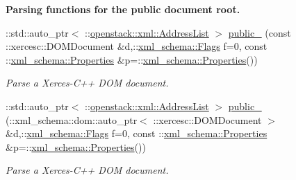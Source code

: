 \begin{Indent}{\bf Parsing functions for the public document root.}
\begin{DoxyCompactItemize}
::std::auto\_\-ptr$<$ ::\hyperlink{classopenstack_1_1xml_1_1AddressList}{openstack::xml::AddressList} $>$ \hyperlink{namespaceopenstack_1_1xml_a0148c3d230d30434ceac70b67bfb94c1}{public\_\-} (const ::xercesc::DOMDocument \&d,::\hyperlink{namespacexml__schema_affb4c227cbd9aa7453dd1dc5a1401943}{xml\_\-schema::Flags} f=0, const ::\hyperlink{namespacexml__schema_ad27ce19a7ee1d3b1064092648898f64c}{xml\_\-schema::Properties} \&p=::\hyperlink{namespacexml__schema_ad27ce19a7ee1d3b1064092648898f64c}{xml\_\-schema::Properties}())
\begin{DoxyCompactList}\small\item\em Parse a Xerces-\/C++ DOM document. \item\end{DoxyCompactList}\item 
::std::auto\_\-ptr$<$ ::\hyperlink{classopenstack_1_1xml_1_1AddressList}{openstack::xml::AddressList} $>$ \hyperlink{namespaceopenstack_1_1xml_a1a40c308f384c211cfca6ee28bcd9b0d}{public\_\-} (::xml\_\-schema::dom::auto\_\-ptr$<$ ::xercesc::DOMDocument $>$ \&d,::\hyperlink{namespacexml__schema_affb4c227cbd9aa7453dd1dc5a1401943}{xml\_\-schema::Flags} f=0, const ::\hyperlink{namespacexml__schema_ad27ce19a7ee1d3b1064092648898f64c}{xml\_\-schema::Properties} \&p=::\hyperlink{namespacexml__schema_ad27ce19a7ee1d3b1064092648898f64c}{xml\_\-schema::Properties}())
\begin{DoxyCompactList}\small\item\em Parse a Xerces-\/C++ DOM document. \item\end{DoxyCompactList}\end{DoxyCompactItemize}
\end{Indent}
